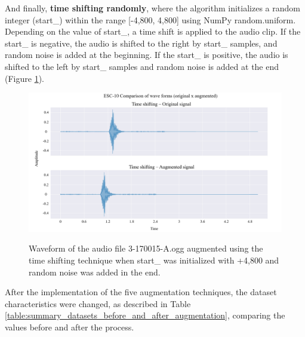 And finally, \textbf{time shifting randomly}, where the algorithm initializes a random integer (start\_) within the range [-4,800, 4,800] using NumPy random.uniform. Depending on the value of start\_, a time shift is applied to the audio clip. If the start\_ is negative, the audio is shifted to the right by start\_ samples, and random noise is added at the beginning. If the start\_ is positive, the audio is shifted to the left by start\_ samples and random noise is added at the end (Figure \ref{fig:methods_augmentation_time_shifting}).

\begin{figure}[htbp]
    \raggedright
        \caption{Waveform of the audio file 3-170015-A.ogg augmented using the time shifting technique when start\_ was initialized with +4,800 and random noise was added in the end.}
        \includegraphics[width=1\textwidth]{resources/images/050-methods/Methods_augmentation_time_shifting.png}
        \label{fig:methods_augmentation_time_shifting}
\end{figure}

After the implementation of the five augmentation techniques, the dataset characteristics were changed, as described in Table \ref{table:summary_datasets_before_and_after_augmentation}, comparing the values before and after the process.

